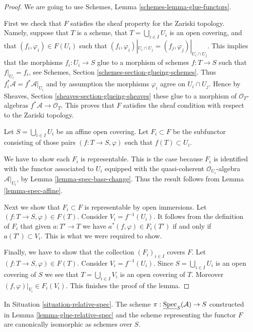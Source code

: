 \begin{proof}
We are going to use Schemes, Lemma \ref{schemes-lemma-glue-functors}.

\medskip\noindent
First we check that $F$ satisfies the sheaf property for the
Zariski topology. Namely, suppose that $T$ is a scheme,
that $T = \bigcup_{i \in I} U_i$ is an open covering,
and that $(f_i, \varphi_i) \in F(U_i)$ such that
$(f_i, \varphi_i)|_{U_i \cap U_j} = (f_j, \varphi_j)|_{U_i \cap U_j}$.
This implies that the morphisms $f_i : U_i \to S$
glue to a morphism of schemes $f : T \to S$ such that
$f|_{U_i} = f_i$, see Schemes, Section \ref{schemes-section-glueing-schemes}.
Thus $f_i^*\mathcal{A} = f^*\mathcal{A}|_{U_i}$ and by assumption the
morphisms $\varphi_i$ agree on $U_i \cap U_j$. Hence by Sheaves,
Section \ref{sheaves-section-glueing-sheaves} these glue to a
morphism of $\mathcal{O}_T$-algebras $f^*\mathcal{A} \to \mathcal{O}_T$.
This proves that $F$ satisfies the sheaf condition with respect to
the Zariski topology.

\medskip\noindent
Let $S = \bigcup_{i \in I} U_i$ be an affine open covering.
Let $F_i \subset F$ be the subfunctor consisting of
those pairs $(f : T \to S, \varphi)$ such that
$f(T) \subset U_i$.

\medskip\noindent
We have to show each $F_i$ is representable.
This is the case because $F_i$ is identified with
the functor associated to $U_i$ equipped with
the quasi-coherent $\mathcal{O}_{U_i}$-algebra $\mathcal{A}|_{U_i}$,
by Lemma \ref{lemma-spec-base-change}.
Thus the result follows from Lemma \ref{lemma-spec-affine}.

\medskip\noindent
Next we show that $F_i \subset F$ is representable by open immersions.
Let $(f : T \to S, \varphi) \in F(T)$. Consider $V_i = f^{-1}(U_i)$.
It follows from the definition of $F_i$ that given $a : T' \to T$
we have $a^*(f, \varphi) \in F_i(T')$ if and only if $a(T') \subset V_i$.
This is what we were required to show.

\medskip\noindent
Finally, we have to show that the collection $(F_i)_{i \in I}$
covers $F$. Let $(f : T \to S, \varphi) \in F(T)$.
Consider $V_i = f^{-1}(U_i)$. Since $S = \bigcup_{i \in I} U_i$
is an open covering of $S$ we see that $T = \bigcup_{i \in I} V_i$
is an open covering of $T$. Moreover $(f, \varphi)|_{V_i} \in F_i(V_i)$.
This finishes the proof of the lemma.
\end{proof}

\begin{lemma}
\label{lemma-glueing-gives-functor-spec}
In Situation \ref{situation-relative-spec}.
The scheme $\pi : \underline{\mathop{\mathrm{Spec}}}_S(\mathcal{A}) \to S$
constructed in Lemma \ref{lemma-glue-relative-spec}
and the scheme representing the functor $F$ are
canonically isomorphic as schemes over $S$.
\end{lemma}

